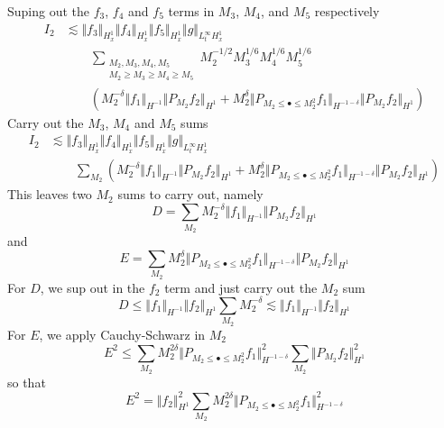 \documentclass[12pt,letterpaper,leqno]{amsart}
\theoremstyle{plain}
\numberwithin{equation}{section}
\numberwithin{theorem}{section}
\numberwithin{proposition}{section}
\numberwithin{lemma}{section}
\numberwithin{corollary}{section}
\begin{document}
Suping out the $f_{3}$, $f_{4}$ and $f_{5}$ terms in $M_{3}$, $M_{4}$, and $%
M_{5}$ respectively 
\begin{align*}
I_{2}& \lesssim \Vert f_{3}\Vert _{H_{x}^{1}}\Vert f_{4}\Vert
_{H_{x}^{1}}\Vert f_{5}\Vert _{H_{x}^{1}}\Vert g\Vert _{L_{t}^{\infty
}H_{x}^{1}} \\
& \qquad \sum_{\substack{ M_{2},M_{3},M_{4},M_{5}  \\ M_{2}\geq M_{3}\geq
M_{4}\geq M_{5}}}M_{2}^{-1/2}M_{3}^{1/6}M_{4}^{1/6}M_{5}^{1/6} \\
& \qquad \left( M_{2}^{-\delta }\Vert f_{1}\Vert _{H^{-1}}\Vert
P_{M_{2}}f_{2}\Vert _{H^{1}}+M_{2}^{\delta }\Vert P_{M_{2}\leq \bullet \leq
M_{2}^{2}}f_{1}\Vert _{H^{-1-\delta }}\Vert P_{M_{2}}f_{2}\Vert
_{H^{1}}\right)
\end{align*}%
Carry out the $M_{3}$, $M_{4}$ and $M_{5}$ sums 
\begin{align*}
I_{2}& \lesssim \Vert f_{3}\Vert _{H_{x}^{1}}\Vert f_{4}\Vert
_{H_{x}^{1}}\Vert f_{5}\Vert _{H_{x}^{1}}\Vert g\Vert _{L_{t}^{\infty
}H_{x}^{1}} \\
& \qquad \sum_{M_{2}}(M_{2}^{-\delta }\Vert f_{1}\Vert _{H^{-1}}\Vert
P_{M_{2}}f_{2}\Vert _{H^{1}}+M_{2}^{\delta }\Vert P_{M_{2}\leq \bullet \leq
M_{2}^{2}}f_{1}\Vert _{H^{-1-\delta }}\Vert P_{M_{2}}f_{2}\Vert _{H^{1}})
\end{align*}%
This leaves two $M_{2}$ sums to carry out, namely 
\begin{equation*}
D=\sum_{M_{2}}M_{2}^{-\delta }\Vert f_{1}\Vert _{H^{-1}}\Vert
P_{M_{2}}f_{2}\Vert _{H^{1}}
\end{equation*}%
and 
\begin{equation*}
E=\sum_{M_{2}}M_{2}^{\delta }\Vert P_{M_{2}\leq \bullet \leq
M_{2}^{2}}f_{1}\Vert _{H^{-1-\delta }}\Vert P_{M_{2}}f_{2}\Vert _{H^{1}}
\end{equation*}%
For $D$, we sup out in the $f_{2}$ term and just carry out the $M_{2}$ sum 
\begin{equation*}
D\leq \Vert f_{1}\Vert _{H^{-1}}\Vert f_{2}\Vert
_{H^{1}}\sum_{M_{2}}M_{2}^{-\delta }\lesssim \Vert f_{1}\Vert _{H^{-1}}\Vert
f_{2}\Vert _{H^{1}}
\end{equation*}%
For $E$, we apply Cauchy-Schwarz in $M_{2}$ 
\begin{equation*}
E^{2}\leq \sum_{M_{2}}M_{2}^{2\delta }\Vert P_{M_{2}\leq \bullet \leq
M_{2}^{2}}f_{1}\Vert _{H^{-1-\delta }}^{2}\sum_{M_{2}}\Vert
P_{M_{2}}f_{2}\Vert _{H^{1}}^{2}
\end{equation*}%
so that 
\begin{equation*}
E^{2}=\Vert f_{2}\Vert _{H^{1}}^{2}\sum_{M_{2}}M_{2}^{2\delta }\Vert
P_{M_{2}\leq \bullet \leq M_{2}^{2}}f_{1}\Vert _{H^{-1-\delta }}^{2}
\end{equation*}%
\end{document}
